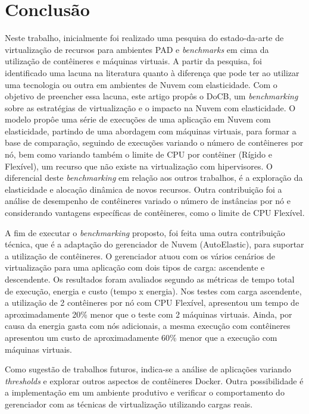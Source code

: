 \documentclass[twoside,english,brazilian]{UNISINOSartigo}
\begin{document}
\section{Conclusão}
\label{conclusion}

Neste trabalho, inicialmente foi realizado uma pesquisa do estado-da-arte de virtualização de recursos para ambientes PAD e \textit{benchmarks} em cima da utilização de contêineres e máquinas virtuais. A partir da pesquisa, foi identificado uma lacuna na literatura quanto à diferença que pode ter ao utilizar uma tecnologia ou outra em ambientes de Nuvem com elasticidade. Com o objetivo de preencher essa lacuna, este artigo propôs o DoCB, um \textit{benchmarking} sobre as estratégias de virtualização e o impacto na Nuvem com elasticidade. O modelo propôe uma série de execuções de uma aplicação em Nuvem com elasticidade, partindo de uma abordagem com máquinas virtuais, para formar a base de comparação, seguindo de execuções variando o número de contêineres por nó, bem como variando também o limite de CPU por contêiner (Rígido e Flexível), um recurso que não existe na virtualização com hipervisores. O diferencial deste \textit{benchmarking} em relação aos outros trabalhos, é a exploração da elasticidade e alocação dinâmica de novos recursos. Outra contribuição foi a análise de desempenho de contêineres variado o número de instâncias por nó e considerando vantagens específicas de contêineres, como o limite de CPU Flexível. 

A fim de executar o \textit{benchmarking} proposto, foi feita uma outra contribuição técnica, que é a adaptação do gerenciador de Nuvem (AutoElastic), para suportar a utilização de contêineres. O gerenciador atuou com os vários cenários de virtualização para uma aplicação com dois tipos de carga: ascendente e descendente. Os resultados foram avaliados segundo as métricas de tempo total de execução, energia e custo (tempo x energia). Nos testes com carga ascendente, a utilização de 2 contêineres por nó com CPU Flexível, apresentou um tempo de aproximadamente 20\% menor que o teste com 2 máquinas virtuais. Ainda, por causa da energia gasta com nós adicionais, a mesma execução com contêineres apresentou um custo de aproximadamente 60\% menor que a execução com máquinas virtuais. 

Como sugestão de trabalhos futuros, indica-se a análise de aplicações variando \textit{thresholds} e explorar outros aspectos de contêineres Docker. Outra possibilidade é a implementação em um ambiente produtivo e verificar o comportamento do gerenciador com as técnicas de virtualização utilizando cargas reais. 
\end{document}
